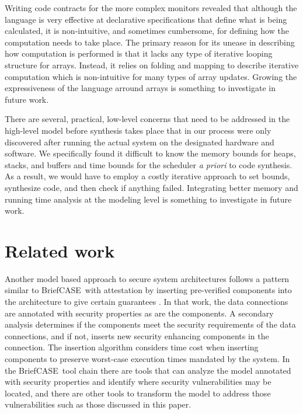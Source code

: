 \documentclass[global,twocolumn]{svjour}
\newcommand{\brfcs}{BriefCASE}
\begin{document}
Writing code contracts for the more complex monitors revealed that although the language is very effective at declarative specifications that define what is being calculated, it is non-intuitive, and sometimes cumbersome, for defining how the computation needs to take place.
%
The primary reason for its unease in describing how computation is performed is that it lacks any type of iterative looping structure for arrays.
%
Instead, it relies on folding and mapping to describe iterative computation which is non-intuitive for many types of array updates.
%
Growing the expressiveness of the language arround arrays is something to investigate in future work.

There are several, practical, low-level concerns that need to be addressed in the high-level model before synthesis takes place that in our process were only discovered after running the actual system on the designated hardware and software.
%
We specifically found it difficult to know the memory bounds for heaps, stacks, and buffers and time bounds for the scheduler \emph{a priori} to code synthesis.
%
As a result, we would have to employ a costly iterative approach to set bounds, synthesize code, and then check if anything failed.
%
Integrating better memory and running time analysis at the modeling level is something to investigate in future work.

\section{Related work}
\label{sec:related-work}

Another model based approach to secure system architectures follows a pattern similar to \brfcs\ with attestation by inserting pre-verified components into the architecture to give certain guarantees \cite{6209212}.
%
In that work, the data connections are annotated with security properties as are the components.
%
A secondary analysis determines if the components meet the security requirements of the data connections, and if not, inserts new security enhancing components in the connection.
%
The insertion algorithm considers time cost when inserting components to preserve worst-case execution times mandated by the system.
%
In the \brfcs\ tool chain there are tools that can analyze the model annotated with security properties and identify where security vulnerabilities may be located, and there are other tools to transform the model to address those vulnerabilities such as those discussed in this paper.
\end{document}
